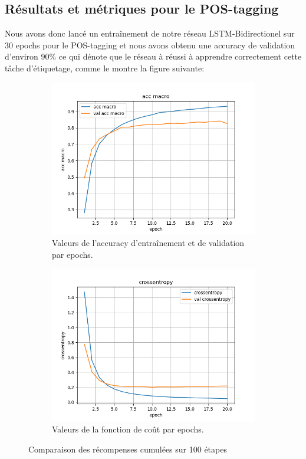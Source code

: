 \documentclass[a4paper]{article}
\begin{document}

\subsection{Résultats et métriques pour le POS-tagging}
Nous avons donc lancé un entraînement de notre réseau LSTM-Bidirectionel sur 30 epochs pour le POS-tagging et 
nous avons obtenu une accuracy de validation d'environ 90\% ce qui dénote que le réseau à réussi à apprendre 
correctement cette tâche d'étiquetage, comme le montre la figure suivante:

\begin{figure}[H]
    \centering
    \begin{subfigure}{0.45\textwidth}
        \centering
        \includegraphics[width=\linewidth]{../logs/get_pos_French_2/acc macro.png}
        \caption{Valeurs de l'accuracy d'entraînement et de validation par epochs.}
    \end{subfigure}
    \hfill
    \begin{subfigure}{0.45\textwidth}
        \centering
        \includegraphics[width=\linewidth]{../logs/get_pos_French_2/crossentropy.png}
        \caption{Valeurs de la fonction de coût par epochs.}
    \end{subfigure}
    \caption{Comparaison des récompenses cumulées sur 100 étapes}
\end{figure}
\end{document}

